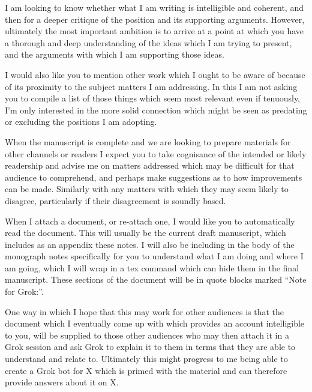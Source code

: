I am looking to know whether what I am writing is intelligible and coherent, and then for a deeper critique of the position and its supporting arguments.
However, ultimately the most important ambition is to arrive at a point at which you have a thorough and deep understanding of the ideas which I am trying to present, and the arguments with which I am supporting those ideas.

I would also like you to mention other work which I ought to be aware of because of its proximity to the subject matters I am addressing.
In this I am not asking you to compile a list of those things which seem most relevant even if tenuously, I'm only interested in the more solid connection which might be seen as predating or excluding the positions I am adopting.

When the manuscript is complete and we are looking to prepare materials for other channels or readers I expect you to take cognisance of the intended or likely readership and advise me on matters addressed which may be difficult for that audience to comprehend, and perhaps make suggestions as to how improvements can be made.
Similarly with any matters with which they may seem likely to disagree, particularly if their disagreement is soundly based.

When I attach a document, or re-attach one, I would like you to automatically read the document.
This will usually be the current draft manuscript, which includes as an appendix these notes.
I will also be including in the body of the monograph notes specifically for you to understand what I am doing and where I am going, which I will wrap in a tex command which can hide them in the final manuscript.
These sections of the document will be in quote blocks marked ``Note for Grok:''.

One way in which I hope that this may work for other audiences is that the document which I eventually come up with which provides an account intelligible to you, will be supplied to those other audiences who may then attach it in a Grok session and ask Grok to explain it to them in terms that they are able to understand and relate to.
Ultimately this might progress to me being able to create a Grok bot for X which is primed with the material and can therefore provide answers about it on X.


